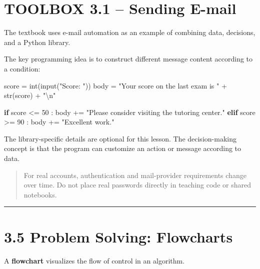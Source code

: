 \documentclass[
  11pt,
  a4paper,
]{article}
\newenvironment{Shaded}{}{}
\newcommand{\BuiltInTok}[1]{\textcolor[rgb]{0.00,0.50,0.00}{#1}}
\newcommand{\CharTok}[1]{\textcolor[rgb]{0.25,0.44,0.63}{#1}}
\newcommand{\ControlFlowTok}[1]{\textcolor[rgb]{0.00,0.44,0.13}{\textbf{#1}}}
\newcommand{\DecValTok}[1]{\textcolor[rgb]{0.25,0.63,0.44}{#1}}
\newcommand{\NormalTok}[1]{#1}
\newcommand{\OperatorTok}[1]{\textcolor[rgb]{0.40,0.40,0.40}{#1}}
\newcommand{\StringTok}[1]{\textcolor[rgb]{0.25,0.44,0.63}{#1}}
\begin{document}
\section{TOOLBOX 3.1 -- Sending
E-mail}\label{toolbox-3.1-sending-e-mail}

The textbook uses e-mail automation as an example of combining data,
decisions, and a Python library.

The key programming idea is to construct different message content
according to a condition:

\begin{Shaded}
\begin{Highlighting}[]
\NormalTok{score }\OperatorTok{=} \BuiltInTok{int}\NormalTok{(}\BuiltInTok{input}\NormalTok{(}\StringTok{"Score: "}\NormalTok{))}
\NormalTok{body }\OperatorTok{=} \StringTok{"Your score on the last exam is "} \OperatorTok{+} \BuiltInTok{str}\NormalTok{(score) }\OperatorTok{+} \StringTok{"}\CharTok{\textbackslash{}n}\StringTok{"}

\ControlFlowTok{if}\NormalTok{ score }\OperatorTok{\textless{}=} \DecValTok{50}\NormalTok{ :}
\NormalTok{    body }\OperatorTok{+=} \StringTok{"Please consider visiting the tutoring center."}
\ControlFlowTok{elif}\NormalTok{ score }\OperatorTok{\textgreater{}=} \DecValTok{90}\NormalTok{ :}
\NormalTok{    body }\OperatorTok{+=} \StringTok{"Excellent work."}
\end{Highlighting}
\end{Shaded}

The library-specific details are optional for this lesson. The
decision-making concept is that the program can customize an action or
message according to data.

\begin{quote}
For real accounts, authentication and mail-provider requirements change
over time. Do not place real passwords directly in teaching code or
shared notebooks.
\end{quote}

\begin{center}\rule{0.5\linewidth}{0.5pt}\end{center}

\section{3.5 Problem Solving:
Flowcharts}\label{problem-solving-flowcharts}

A \textbf{flowchart} visualizes the flow of control in an algorithm.
\end{document}
